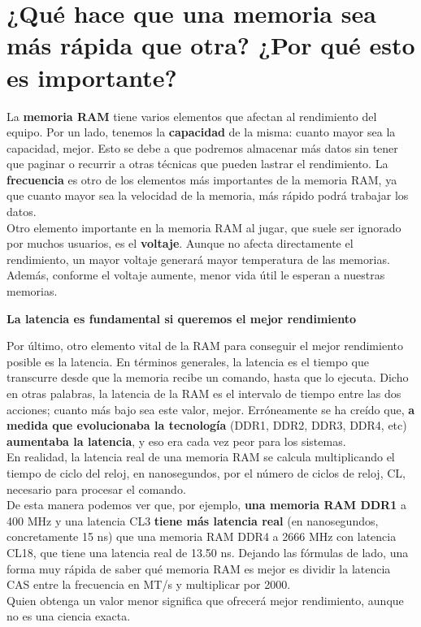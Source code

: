 \documentclass[10pt,letterpaper]{article}
\begin{document}
\newpage
\noindent
\section{¿Qué hace que una memoria sea más rápida que otra? ¿Por qué esto es importante?}\label{contenido}

\begin{justify}
	
	\noindent
	La \textbf{memoria RAM} tiene varios elementos que afectan al rendimiento del equipo. Por un lado, tenemos la \textbf{capacidad} de la misma: cuanto mayor sea la capacidad, mejor. Esto se debe a que podremos almacenar más datos sin tener que paginar o recurrir a otras técnicas que pueden lastrar el rendimiento. La \textbf{frecuencia} es otro de los elementos más importantes de la memoria RAM, ya que cuanto mayor sea la velocidad de la memoria, más rápido podrá trabajar los datos.\\
	
	\noindent
	Otro elemento importante en la memoria RAM al jugar, que suele ser ignorado por muchos usuarios, es el \textbf{voltaje}. Aunque no afecta directamente el rendimiento, un mayor voltaje generará mayor temperatura de las memorias. Además, conforme el voltaje aumente, menor vida útil le esperan a nuestras memorias.\\

	\begin{center}
		\textbf{La latencia es fundamental si queremos el mejor rendimiento}
	\end{center}

	\noindent
	Por último, otro elemento vital de la RAM para conseguir el mejor rendimiento posible es la latencia. En términos generales, la latencia es el tiempo que transcurre desde que la memoria recibe un comando, hasta que lo ejecuta. Dicho en otras palabras, la latencia de la RAM es el intervalo de tiempo entre las dos acciones; cuanto más bajo sea este valor, mejor. Erróneamente se ha creído que, \textbf{a medida que evolucionaba la tecnología} (DDR1, DDR2, DDR3, DDR4, etc) \textbf{aumentaba la latencia}, y eso era cada vez peor para los sistemas.\cite{octava}\\
	
	\noindent
	En realidad, la latencia real de una memoria RAM se calcula multiplicando el tiempo de ciclo del reloj, en nanosegundos, por el número de ciclos de reloj, CL, necesario para procesar el comando.\\
	
	\noindent
	De esta manera podemos ver que, por ejemplo, \textbf{una memoria RAM DDR1} a 400 MHz y una latencia CL3 \textbf{tiene más latencia real} (en nanosegundos, concretamente 15 ns) que una memoria RAM DDR4 a 2666 MHz con latencia CL18, que tiene una latencia real de 13.50 ns. Dejando las fórmulas de lado, una forma muy rápida de saber qué memoria RAM es mejor es dividir la latencia CAS entre la frecuencia en MT/s y multiplicar por 2000.\\
	Quien obtenga un valor menor significa que ofrecerá mejor rendimiento, aunque no es una ciencia exacta.\\
		 
\end{justify}
\end{document}
